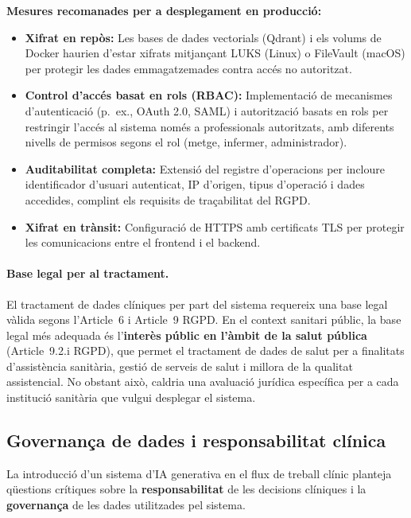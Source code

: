 \documentclass[CAT]{TFUOC}%
\begin{document}
\textbf{Mesures recomanades per a desplegament en producció:}
\begin{itemize}
    \item \textbf{Xifrat en repòs:} Les bases de dades vectorials (Qdrant) i els volums de Docker haurien d'estar xifrats mitjançant LUKS (Linux) o FileVault (macOS) per protegir les dades emmagatzemades contra accés no autoritzat.
    
    \item \textbf{Control d'accés basat en rols (RBAC):} Implementació de mecanismes d'autenticació (p.~ex., OAuth 2.0, SAML) i autorització basats en rols per restringir l'accés al sistema només a professionals autoritzats, amb diferents nivells de permisos segons el rol (metge, infermer, administrador).
    
    \item \textbf{Auditabilitat completa:} Extensió del registre d'operacions per incloure identificador d'usuari autenticat, IP d'origen, tipus d'operació i dades accedides, complint els requisits de traçabilitat del RGPD.
    
    \item \textbf{Xifrat en trànsit:} Configuració de HTTPS amb certificats TLS per protegir les comunicacions entre el frontend i el backend.
\end{itemize}

\paragraph{Base legal per al tractament.}
El tractament de dades clíniques per part del sistema requereix una base legal vàlida segons l'Article~6 i Article~9 RGPD. En el context sanitari públic, la base legal més adequada és l'\textbf{interès públic en l'àmbit de la salut pública} (Article~9.2.i RGPD), que permet el tractament de dades de salut per a finalitats d'assistència sanitària, gestió de serveis de salut i millora de la qualitat assistencial. No obstant això, caldria una avaluació jurídica específica per a cada institució sanitària que vulgui desplegar el sistema.

\subsection{Governança de dades i responsabilitat clínica}

La introducció d'un sistema d'IA generativa en el flux de treball clínic planteja qüestions crítiques sobre la \textbf{responsabilitat} de les decisions clíniques i la \textbf{governança} de les dades utilitzades pel sistema.
\end{document}
